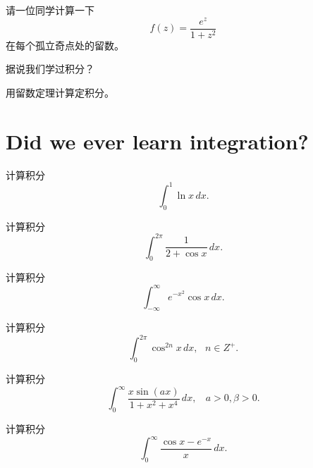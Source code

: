 \documentclass[CJK]{beamer}
\date{}
\begin{document}


\begin{frame}
  \bch
  请一位同学计算一下$$f(z) = \frac{e^z}{1+z^2}$$在每个孤立奇点处的留数。
  \ech
\end{frame}


\begin{frame}
\bch
\bitem
\item{据说我们学过积分？}
\item{用留数定理计算定积分。}
 \eitem
\ech
\end{frame}


\section{Did we ever learn integration?}


\begin{frame}
  \bch

  计算积分$$ \int_0^1 \ln x \, dx. $$
  \ech
\end{frame}

\begin{frame}
  \bch

  计算积分$$ \int_0^{2\pi}\frac{1}{2+\cos x} \, dx. $$
  \ech
\end{frame}


\begin{frame}
  \bch

  计算积分$$ \int_{-\infty}^\infty e^{-x^2}\cos x \, dx .$$
  \ech
\end{frame}

\begin{frame}
  \bch

  计算积分$$ \int_0^{2\pi} \cos^{2n}x\, dx,\ \ \ n \in Z^+. $$
  \ech
\end{frame}

\begin{frame}
  \bch
  计算积分$$\int_0^\infty \frac{x\sin{(ax)}}{1+x^2+x^4}\,dx, \ \ \ \ a>0, \beta>0.$$
  \ech
\end{frame}

\begin{frame}
  \bch
  计算积分$$ \int_0^{\infty} \frac{\cos{x} - e^{-x}}{x}\, dx.$$
  \ech
\end{frame}
\end{document}
